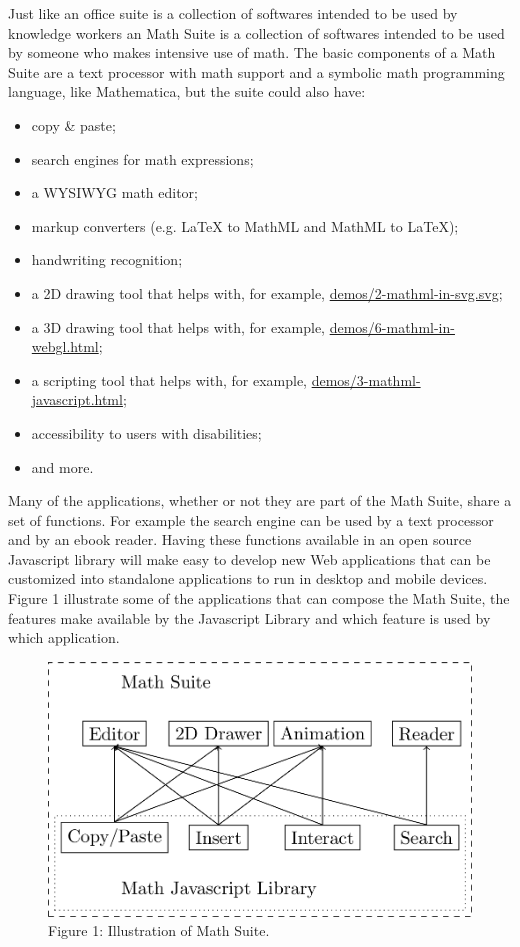 Just like an office suite is a collection of softwares intended to be used by
knowledge workers an Math Suite is a collection of softwares intended to be used
by someone who makes intensive use of math. The basic components of a Math
Suite are a text processor with math support and a symbolic math programming
language, like Mathematica, but the suite could also have:
\begin{itemize}
  \item copy \& paste;
  \item search engines for math expressions;
  \item a WYSIWYG math editor;
  \item markup converters (e.g. LaTeX to MathML and MathML to LaTeX);
  \item handwriting recognition;
  \item a 2D drawing tool that helps with, for example,
    \href{http://fred-wang.github.io/MathUI2014/demos/2-mathml-in-svg.svg}{demos/2-mathml-in-svg.svg};
  \item a 3D drawing tool that helps with, for example,
    \href{http://fred-wang.github.io/MathUI2014/demos/6-mathml-in-webgl.html}{demos/6-mathml-in-webgl.html};
  \item a scripting tool that helps with, for example,
    \href{http://fred-wang.github.io/MathUI2014/demos/3-mathml-javascript.html}{demos/3-mathml-javascript.html};
  \item accessibility to users with disabilities;
  \item and more.
\end{itemize}

Many of the applications, whether or not they are part of the Math Suite,
share a set of functions. For
example the search engine can be used by a text processor and by an ebook
reader. Having
these functions available in an open source Javascript library will make easy to
develop new Web applications that can be customized into standalone applications
to run in desktop and mobile devices. Figure 1 illustrate some of the
applications that can compose the Math Suite, the features make available by the
Javascript Library and which feature is used by which application.

\begin{figure}[!htb]
  \centering
  \includegraphics[width=.5\textwidth]{math-suite-diagram.png} \\
  Figure 1: Illustration of Math Suite.
\end{figure}

